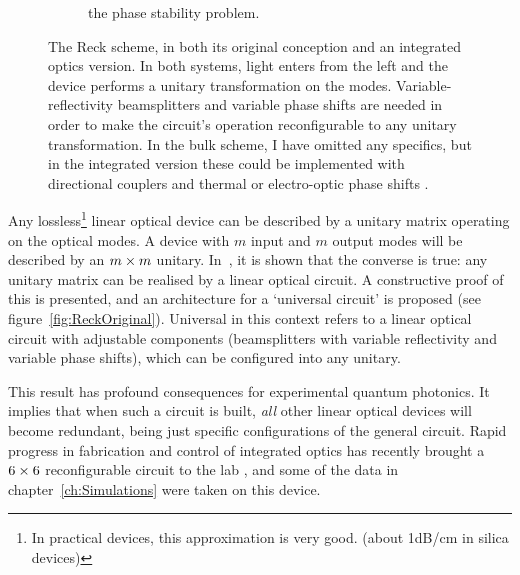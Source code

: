 \begin{figure}[p]
\begin{subfigure}{\textwidth}
{    the phase stability problem.}
    \label{fig:ReckGeneral}
  \end{subfigure}
  \caption[The Reck scheme, in both its original conception and an integrated
  optics version]{The Reck scheme, in both its original conception and an
  integrated
  optics version. In both systems, light enters from the left and the device
  performs a unitary transformation on the modes. Variable-reflectivity
  beamsplitters and variable phase shifts are needed in order to make the
  circuit's operation reconfigurable to any unitary transformation. In the
  bulk scheme, I have omitted any specifics, but in the integrated version these
  could be implemented with directional couplers and thermal or electro-optic
  phase shifts \cite{peteschip}.}
  \label{fig:ReckScheme}
\end{figure}
Any lossless\footnote{In practical devices, this approximation is very good.
(about 1dB/cm in silica devices)} linear optical device can be
described by a unitary matrix operating on the optical modes. A device with
\(m\) input and \(m\) output modes will be described by an \(m \times m\) unitary.
In~\cite{reck}, it is shown that the converse is true: any unitary matrix can
be realised by a linear optical circuit. A constructive proof of this is
presented, and an architecture for a `universal circuit' is proposed (see
figure~\ref{fig:ReckOriginal}). Universal in this context refers to a linear
optical circuit with adjustable components (beamsplitters with variable
reflectivity and variable phase shifts), which can be configured into any
unitary.

This result has profound consequences for experimental quantum photonics.
It implies that when such a circuit is built, \emph{all} other linear optical
devices will become redundant, being just specific configurations of the
general circuit. Rapid progress in fabrication and control of integrated optics
has recently brought a \(6 \times 6\) reconfigurable circuit to the lab
\cite{bigreck}, and some of the data in chapter~\ref{ch:Simulations} were taken
on this device.


